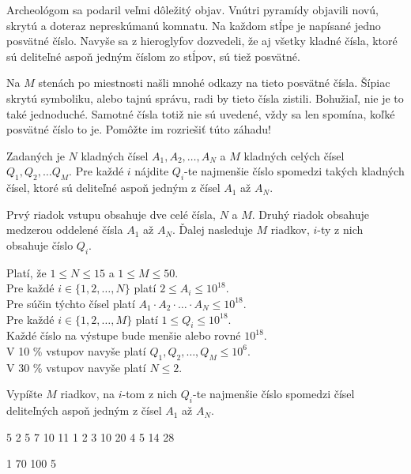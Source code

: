 





Archeológom sa podaril veľmi dôležitý objav. Vnútri pyramídy objavili novú,
skrytú a doteraz nepreskúmanú komnatu. Na každom stĺpe je napísané jedno
posvätné číslo. Navyše sa z hieroglyfov dozvedeli, že aj všetky kladné čísla, ktoré
sú deliteľné aspoň jedným číslom zo stĺpov, sú tiež posvätné.

Na $M$ stenách po miestnosti našli mnohé odkazy na tieto posvätné čísla. Šípiac
skrytú symboliku, alebo tajnú správu, radi by tieto čísla zistili. Bohužiaľ, nie
je to také jednoduché. Samotné čísla totiž nie sú uvedené, vždy sa len spomína,
koľké posvätné číslo to je. Pomôžte im rozriešiť túto záhadu!


Zadaných je $N$ kladných čísel $A_1, A_2, \ldots, A_N$ a $M$ kladných celých čísel
$Q_1, Q_2, \ldots Q_M$. Pre každé $i$ nájdite $Q_i$-te najmenšie číslo spomedzi
takých kladných čísel, ktoré sú deliteľné aspoň jedným z čísel $A_1$ až $A_N$.


Prvý riadok vstupu obsahuje dve celé čísla, $N$ a $M$. Druhý riadok obsahuje
medzerou oddelené čísla $A_1$ až $A_N$. Ďalej nasleduje $M$ riadkov, $i$-ty z nich
obsahuje číslo $Q_i$.

\bigskip
\noindent
Platí, že $1 \leq N \leq 15$ a $1 \leq M \leq 50$.\\
Pre každé $i \in \{ 1, 2, \ldots, N \}$ platí $2 \leq A_i \leq 10^{18}$.\\
Pre súčin týchto čísel platí $A_1 \cdot A_2 \cdot \ldots \cdot A_N \leq 10^{18}$.\\
Pre každé $i \in \{ 1, 2, \ldots, M \}$ platí $1 \leq Q_i \leq 10^{18}$.\\
Každé číslo na výstupe bude menšie alebo rovné $10^{18}$.\\
V 10 \% vstupov navyše platí $Q_1, Q_2, \ldots, Q_M \leq 10^6$.\\
V 30 \% vstupov navyše platí $N \leq 2$.


Vypíšte $M$ riadkov, na $i$-tom z nich $Q_i$-te najmenšie číslo spomedzi
čísel deliteľných aspoň jedným z čísel $A_1$ až $A_N$.


 5
2 5 7 10 11
1
2
3
10
20
4
5
14
28
\sampleEND

 1
70 100
5
\sampleEND


